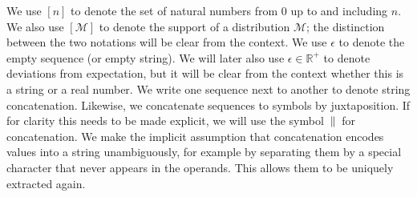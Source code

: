 We use $[n]$ to denote the set of natural numbers from $0$ up to and including
$n$. We also use $[\mathcal{M}]$ to denote the support of a distribution
$\mathcal{M}$; the distinction between the two notations will be clear from the
context.
We use $\epsilon$ to denote the empty sequence (or empty string). We will later
also use $\epsilon \in \mathbb{R}^+$ to denote deviations from expectation, but
it will be clear from the context whether this is a string or a real number. We
write one sequence next to another to denote string concatenation. Likewise, we
concatenate sequences to symbols by juxtaposition. If for clarity this needs to
be made explicit, we will use the symbol $\,\|\,$ for concatenation. We make
the implicit assumption that concatenation encodes values into a string
unambiguously, for example by separating them by a special character that never
appears in the operands. This allows them to be uniquely extracted again.

